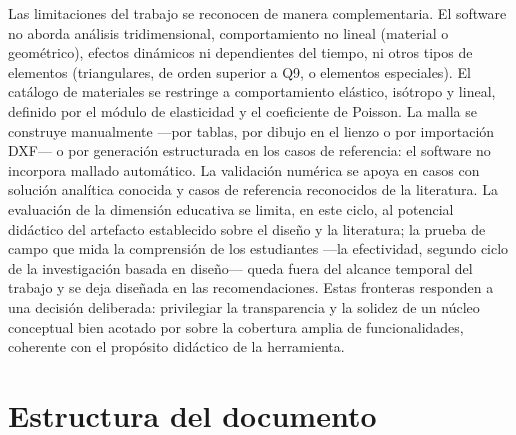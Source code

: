 Las limitaciones del trabajo se reconocen de manera complementaria. El software no aborda análisis tridimensional, comportamiento no lineal (material o geométrico), efectos dinámicos ni dependientes del tiempo, ni otros tipos de elementos (triangulares, de orden superior a Q9, o elementos especiales). El catálogo de materiales se restringe a comportamiento elástico, isótropo y lineal, definido por el módulo de elasticidad y el coeficiente de Poisson. La malla se construye manualmente —por tablas, por dibujo en el lienzo o por importación DXF— o por generación estructurada en los casos de referencia: el software no incorpora mallado automático. La validación numérica se apoya en casos con solución analítica conocida y casos de referencia reconocidos de la literatura. La evaluación de la dimensión educativa se limita, en este ciclo, al potencial didáctico del artefacto establecido sobre el diseño y la literatura; la prueba de campo que mida la comprensión de los estudiantes —la efectividad, segundo ciclo de la investigación basada en diseño— queda fuera del alcance temporal del trabajo y se deja diseñada en las recomendaciones. Estas fronteras responden a una decisión deliberada: privilegiar la transparencia y la solidez de un núcleo conceptual bien acotado por sobre la cobertura amplia de funcionalidades, coherente con el propósito didáctico de la herramienta.

\section*{Estructura del documento}

